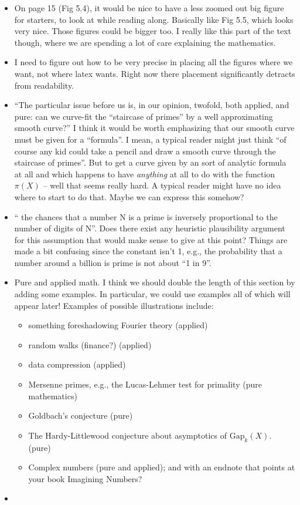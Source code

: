 \documentclass{article}
\begin{document}
\begin{itemize}
\item On page 15 (Fig 5.4), it would be nice to have a less zoomed out
  big figure for starters, to look at while reading along.  Basically
  like Fig 5.5, which looks very nice.  Those figures could be bigger
  too.  I really like this part of the text though, where we are
  spending a lot of care explaining the mathematics.

\item I need to figure out how to be very precise in placing all the
  figures where we want, not where latex wants.  Right now there
  placement significantly detracts from readability.

\item ``The particular issue before us is, in our opinion, twofold,
  both applied, and pure: can we curve-fit the “staircase of primes”
  by a well approximating smooth curve?''  I think it would be worth
  emphasizing that our smooth curve must be given for a ``formula''.
  I mean, a typical reader might just think ``of course any kid could
  take a pencil and draw a smooth curve through the staircase of
  primes''.  But to get a curve given by an sort of analytic formula
  at all and which happens to have {\em anything } at all to do with
  the function $\pi(X)$ -- well that seems really hard.  A typical
  reader might have no idea where to start to do that.  Maybe we can
  express this somehow?  

\item `` the chances that a number N is a prime is inversely
  proportional to the number of digits of N''. Does there exist any
  heuristic plausibility argument for this assumption that would make
  sense to give at this point?  Things are made a bit confusing since
  the constant isn't 1, e.g., the probability that a number around a
  billion is prime is not about ``1 in 9''.

\item Pure and applied math.  I think we should double the length of
  this section by adding some examples.  In particular, we could use
  examples all of which will appear later!  Examples of possible
  illustrations include:
\begin{itemize}
  \item something foreshadowing Fourier theory (applied)
  \item random walks (finance?)  (applied)
  \item data compression (applied)
  \item Mersenne primes, e.g., the Lucas-Lehmer test for primality (pure mathematics)
  \item Goldbach's conjecture (pure)
  \item The Hardy-Littlewood conjecture about asymptotics of $\text{Gap}_k(X)$. (pure)
  \item Complex numbers (pure and applied); and with an endnote that
    points at your book Imagining Numbers?
  \end{itemize}
  
\item 

\end{itemize}
\end{document}
